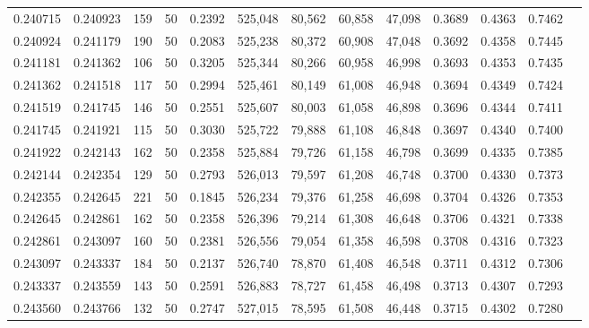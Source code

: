 \begin{tabular}{rrrrrrrrrrrrr}
0.240715 & 0.240923 &   159 &  50 &                                     0.2392 & 525,048 &  80,562 &  60,858 &  47,098 & 0.3689 & 0.4363 & 0.7462 \\
0.240924 & 0.241179 &   190 &  50 &                                     0.2083 & 525,238 &  80,372 &  60,908 &  47,048 & 0.3692 & 0.4358 & 0.7445 \\
0.241181 & 0.241362 &   106 &  50 &                                     0.3205 & 525,344 &  80,266 &  60,958 &  46,998 & 0.3693 & 0.4353 & 0.7435 \\
0.241362 & 0.241518 &   117 &  50 &                                     0.2994 & 525,461 &  80,149 &  61,008 &  46,948 & 0.3694 & 0.4349 & 0.7424 \\
0.241519 & 0.241745 &   146 &  50 &                                     0.2551 & 525,607 &  80,003 &  61,058 &  46,898 & 0.3696 & 0.4344 & 0.7411 \\
0.241745 & 0.241921 &   115 &  50 &                                     0.3030 & 525,722 &  79,888 &  61,108 &  46,848 & 0.3697 & 0.4340 & 0.7400 \\
0.241922 & 0.242143 &   162 &  50 &                                     0.2358 & 525,884 &  79,726 &  61,158 &  46,798 & 0.3699 & 0.4335 & 0.7385 \\
0.242144 & 0.242354 &   129 &  50 &                                     0.2793 & 526,013 &  79,597 &  61,208 &  46,748 & 0.3700 & 0.4330 & 0.7373 \\
0.242355 & 0.242645 &   221 &  50 &                                     0.1845 & 526,234 &  79,376 &  61,258 &  46,698 & 0.3704 & 0.4326 & 0.7353 \\
0.242645 & 0.242861 &   162 &  50 &                                     0.2358 & 526,396 &  79,214 &  61,308 &  46,648 & 0.3706 & 0.4321 & 0.7338 \\
0.242861 & 0.243097 &   160 &  50 &                                     0.2381 & 526,556 &  79,054 &  61,358 &  46,598 & 0.3708 & 0.4316 & 0.7323 \\
0.243097 & 0.243337 &   184 &  50 &                                     0.2137 & 526,740 &  78,870 &  61,408 &  46,548 & 0.3711 & 0.4312 & 0.7306 \\
0.243337 & 0.243559 &   143 &  50 &                                     0.2591 & 526,883 &  78,727 &  61,458 &  46,498 & 0.3713 & 0.4307 & 0.7293 \\
0.243560 & 0.243766 &   132 &  50 &                                     0.2747 & 527,015 &  78,595 &  61,508 &  46,448 & 0.3715 & 0.4302 & 0.7280 \\

\end{tabular}
